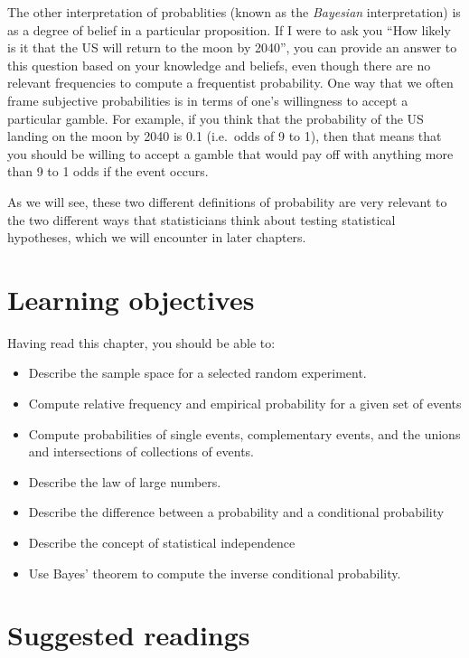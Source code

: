 \documentclass[12pt,]{book}
\providecommand{\tightlist}{%
  \setlength{\itemsep}{0pt}\setlength{\parskip}{0pt}}
\theoremstyle{definition}
\theoremstyle{definition}
\theoremstyle{definition}
\theoremstyle{remark}
\begin{document}
The other interpretation of probablities (known as the \emph{Bayesian} interpretation) is as a degree of belief in a particular proposition. If I were to ask you ``How likely is it that the US will return to the moon by 2040'', you can provide an answer to this question based on your knowledge and beliefs, even though there are no relevant frequencies to compute a frequentist probability. One way that we often frame subjective probabilities is in terms of one's willingness to accept a particular gamble. For example, if you think that the probability of the US landing on the moon by 2040 is 0.1 (i.e.~odds of 9 to 1), then that means that you should be willing to accept a gamble that would pay off with anything more than 9 to 1 odds if the event occurs.

As we will see, these two different definitions of probability are very relevant to the two different ways that statisticians think about testing statistical hypotheses, which we will encounter in later chapters.

\hypertarget{learning-objectives-5}{%
\section{Learning objectives}\label{learning-objectives-5}}

Having read this chapter, you should be able to:

\begin{itemize}
\tightlist
\item
  Describe the sample space for a selected random experiment.
\item
  Compute relative frequency and empirical probability for a given set of events
\item
  Compute probabilities of single events, complementary events, and the unions and intersections of collections of events.
\item
  Describe the law of large numbers.
\item
  Describe the difference between a probability and a conditional probability
\item
  Describe the concept of statistical independence
\item
  Use Bayes' theorem to compute the inverse conditional probability.
\end{itemize}

\hypertarget{suggested-readings-3}{%
\section{Suggested readings}\label{suggested-readings-3}}
\end{document}
